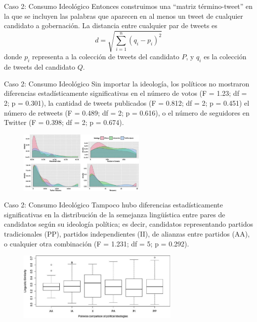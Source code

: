 \documentclass{beamer}
\begin{document}
\begin{frame}{Caso 2: Consumo Ideológico}
Entonces construimos una ``matriz término-tweet'' en la que se incluyen las palabras que aparecen en al menos un tweet de cualquier candidato a gobernación. La distancia entre cualquier par de tweets es 
\begin{equation}
    d = \sqrt{\sum_{i =1}^{n}(q_i - p_i)^2}
\end{equation}
donde $p_i$ representa a la colección de tweets del candidato $P$, y $q_i$ es la colección de tweets del candidato $Q$.
\end{frame}

\begin{frame}{Caso 2: Consumo Ideológico}
Sin importar la ideología, los políticos no mostraron diferencias estadísticamente significativas en el número de votos (F = 1.23; df = 2; p = 0.301), la cantidad de tweets publicados (F = 0.812; df = 2; p = 0.451) el número de retweets (F = 0.489; df = 2; p = 0.616), o el número de seguidores en Twitter (F = 0.398; df = 2; p = 0.674).
\begin{figure}
\centering
\includegraphics[width=0.55\textwidth]{f1}
\end{figure}
\end{frame}

\begin{frame}{Caso 2: Consumo Ideológico}
Tampoco hubo diferencias estadísticamente significativas en la distribución de la semejanza lingüística entre pares de candidatos según su ideología política; es decir, candidatos representando partidos tradicionales (PP), partidos independientes (II), de alianzas entre partidos (AA), o cualquier otra combinación (F = 1.231; df = 5; p = 0.292).
\begin{figure}
\centering
\includegraphics[width=0.7\textwidth]{f2}
\end{figure}
\end{frame}
\end{document}
